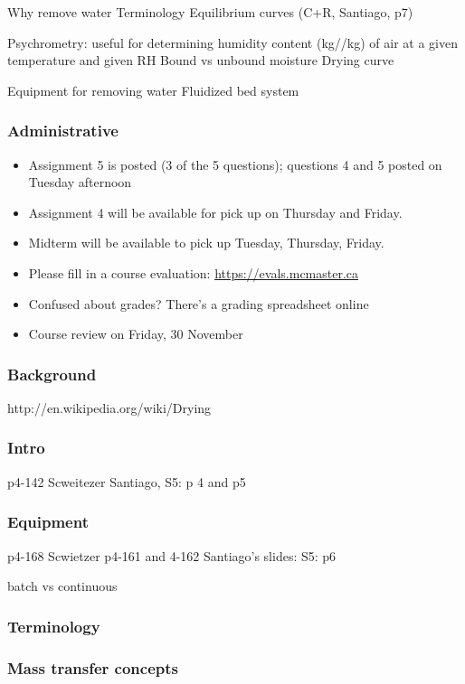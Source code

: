 
Why remove water
Terminology
Equilibrium curves (C+R, Santiago, p7)

Psychrometry: useful for determining humidity content (kg//kg) of air at a given temperature and given RH
Bound vs unbound moisture
Drying curve


Equipment for removing water
Fluidized bed system

\begin{frame}\frametitle{Administrative}
	\begin{itemize}
		\item	Assignment 5 is posted (3 of the 5 questions); questions 4 and 5 posted on Tuesday afternoon
		\item	Assignment 4 will be available for pick up on Thursday and Friday.
		\item	Midterm will be available to pick up Tuesday, Thursday, Friday.
		\item	Please fill in a course evaluation: \href{https://evals.mcmaster.ca}{https://evals.mcmaster.ca}
		\item	Confused about grades? There's a grading spreadsheet online
	\end{itemize}
	\vspace{12pt}
	\begin{itemize}
		\item	Course review on Friday, 30 November
	\end{itemize}
\end{frame}

\begin{frame}\frametitle{Background}
	http://en.wikipedia.org/wiki/Drying
\end{frame}

\begin{frame}\frametitle{Intro}
	p4-142 Scweitezer
	Santiago, S5: p 4 and p5
\end{frame}

\begin{frame}\frametitle{Equipment}
	p4-168 Scwietzer
	p4-161 and 4-162
	Santiago's slides: S5: p6
	
	batch vs continuous
\end{frame}

\begin{frame}\frametitle{Terminology}
	
\end{frame}

\begin{frame}\frametitle{Mass transfer concepts}
	
\end{frame}

